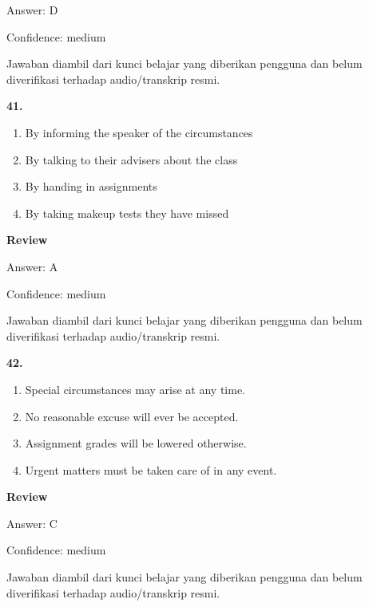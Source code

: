 \documentclass[12pt]{article}
\begin{document}
Answer: D\par
Confidence: medium\par
Jawaban diambil dari kunci belajar yang diberikan pengguna dan belum diverifikasi terhadap audio/transkrip resmi.\par
\endgroup
\par
\vspace{0.25\baselineskip}
\noindent\textbf{41.}
\begin{enumerate}[label=(\Alph*),leftmargin=*,itemsep=0.2em]
\item By informing the speaker of the circumstances
\item By talking to their advisers about the class
\item By handing in assignments
\item By taking makeup tests they have missed
\end{enumerate}
\par
\begingroup
\setlength{\parskip}{0pt}
\setlength{\parindent}{0pt}
\textbf{Review}\par
Answer: A\par
Confidence: medium\par
Jawaban diambil dari kunci belajar yang diberikan pengguna dan belum diverifikasi terhadap audio/transkrip resmi.\par
\endgroup
\par
\vspace{0.25\baselineskip}
\noindent\textbf{42.}
\begin{enumerate}[label=(\Alph*),leftmargin=*,itemsep=0.2em]
\item Special circumstances may arise at any time.
\item No reasonable excuse will ever be accepted.
\item Assignment grades will be lowered otherwise.
\item Urgent matters must be taken care of in any event.
\end{enumerate}
\par
\begingroup
\setlength{\parskip}{0pt}
\setlength{\parindent}{0pt}
\textbf{Review}\par
Answer: C\par
Confidence: medium\par
Jawaban diambil dari kunci belajar yang diberikan pengguna dan belum diverifikasi terhadap audio/transkrip resmi.\par
\endgroup
\par
\vspace{0.25\baselineskip}
\end{document}
